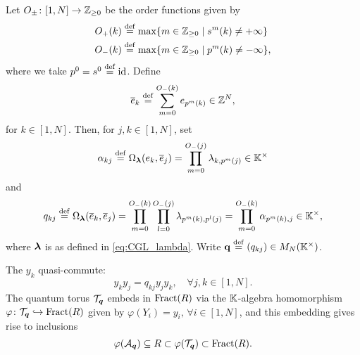 Let $O_{\pm} \colon [1, N] \to \mathbb{Z}_{\geq 0}$ be the order
functions given by
\begin{align*}
	O_{+}(k) & \overset{\mathrm{def}}{=} \max\{m \in \mathbb{Z}_{\geq 0} \mid s^m(k) \neq + \infty\}   \\
	O_{-}(k) & \overset{\mathrm{def}}{=} \max\{m \in \mathbb{Z}_{\geq 0} \mid p^m(k) \neq - \infty\} ,
\end{align*}
%
where we take $p^0 = s^0 \overset{\mathrm{def}}{=} \operatorname{id}$. Define
\begin{equation*}
	\overline{e}_k \overset{\mathrm{def}}{=} \sum_{m=0}^{O_{-}(k)} e_{p^m(k)} \in \mathbb{Z}^N,
\end{equation*}
%
for $k \in [1, N]$. Then, for $j,k \in [1, N]$, set
\begin{equation*}
	\alpha_{kj} \overset{\mathrm{def}}{=} \Omega_{\boldsymbol{\lambda}}(e_k, \overline{e}_j) = \prod_{m=0}^{O_{-}(j)}\lambda_{k, p^m(j)} \in \mathbb{K}^\times
\end{equation*}
and
\begin{equation}\label{eq:q_from_lambda}
	q_{kj} \overset{\mathrm{def}}{=} \Omega_{\boldsymbol{\lambda}}(\overline{e}_k, \overline{e}_j) = \prod_{m=0}^{O_{-}(k)}\prod_{l=0}^{O_{-}(j)}\lambda_{p^m(k),p^l(j)} = \prod_{m=0}^{O_{-}(k)}\alpha_{p^m (k),j} \in \mathbb{K}^\times,
\end{equation}
%
where $\boldsymbol{\lambda}$ is as defined in \cref{eq:CGL_lambda}. Write $\mathbf{q} \overset{\mathrm{def}}{=} (q_{kj}) \in
	M_N(\mathbb{K}^\times)$.
\begin{proposition}\label{prop:y_quantum_torus}
	The $y_k$ quasi-commute:
	\begin{equation}\label{eq:y_quasi_commute}
		y_k y_j = q_{kj}y_jy_k, \quad \forall j, k \in [1, N].
	\end{equation}
	The quantum torus $\mathcal{T}_{\boldsymbol{q}}$ embeds in $\operatorname{Fract}(R)$ via the $\mathbb{K}$-algebra
	homomorphism $\varphi \colon \mathcal{T}_{\boldsymbol{q}} \hookrightarrow \operatorname{Fract}(R)$ given by $\varphi(Y_i) =
		y_i,\,\forall i \in [1, N]$, and this embedding gives rise to inclusions
	\begin{equation*}
		\varphi(\mathcal{A}_{\boldsymbol{q}}) \subseteq R \subset \varphi(\mathcal{T}_{\boldsymbol{q}}) \subset \operatorname{Fract}(R).
	\end{equation*}
\end{proposition}

